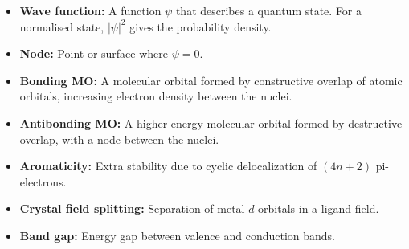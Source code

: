 \documentclass[12pt,a4paper]{article}
\begin{document}
\begin{tcolorbox}[defbox, title={One-Line Definitions}]
\begin{itemize}[leftmargin=*, itemsep=2pt, topsep=2pt]
  \item \textbf{Wave function:} A function $\psi$ that describes a quantum state. For a normalised state, $|\psi|^2$ gives the probability density.
  \item \textbf{Node:} Point or surface where $\psi=0$.
  \item \textbf{Bonding MO:} A molecular orbital formed by constructive overlap of atomic orbitals, increasing electron density between the nuclei.
  \item \textbf{Antibonding MO:} A higher-energy molecular orbital formed by destructive overlap, with a node between the nuclei.
  \item \textbf{Aromaticity:} Extra stability due to cyclic delocalization of $(4n+2)$ pi-electrons.
  \item \textbf{Crystal field splitting:} Separation of metal $d$ orbitals in a ligand field.
  \item \textbf{Band gap:} Energy gap between valence and conduction bands.
\end{itemize}
\end{tcolorbox}
\end{document}
